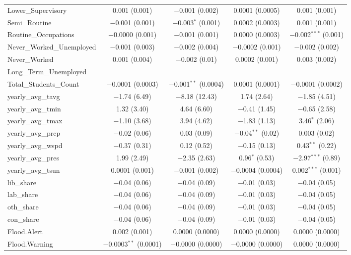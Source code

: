 \documentclass[12pt,letterpaper]{article}
\begin{document}
\begin{table}[!htbp]
\begin{adjustbox}{width=\textwidth}
\begin{tabular}{@{\extracolsep{5pt}}lcccc}
			Lower\_Supervisory & 0.001 (0.001) & $-$0.001 (0.002) & 0.0001 (0.0005) & 0.001 (0.001) \\ 
			Semi\_Routine & $-$0.001 (0.001) & $-$0.003$^{*}$ (0.001) & 0.0002 (0.0003) & 0.001 (0.001) \\ 
			Routine\_Occupations & $-$0.0000 (0.001) & $-$0.001 (0.001) & 0.0000 (0.0003) & $-$0.002$^{***}$ (0.001) \\ 
			Never\_Worked\_Unemployed & $-$0.001 (0.003) & $-$0.002 (0.004) & $-$0.0002 (0.001) & $-$0.002 (0.002) \\ 
			Never\_Worked & 0.001 (0.004) & $-$0.002 (0.01) & 0.0002 (0.001) & 0.003 (0.002) \\ 
			Long\_Term\_Unemployed &  &  &  &  \\ 
			Total\_Students\_Count & $-$0.0001 (0.0003) & $-$0.001$^{**}$ (0.0004) & 0.0001 (0.0001) & $-$0.0001 (0.0002) \\ 
			yearly\_avg\_tavg & $-$1.74 (6.49) & $-$8.18 (12.43) & 1.74 (2.64) & $-$1.85 (4.51) \\ 
			yearly\_avg\_tmin & 1.32 (3.40) & 4.64 (6.60) & $-$0.41 (1.45) & $-$0.65 (2.58) \\ 
			yearly\_avg\_tmax & $-$1.10 (3.68) & 3.94 (4.62) & $-$1.83 (1.13) & 3.46$^{*}$ (2.06) \\ 
			yearly\_avg\_prcp & $-$0.02 (0.06) & 0.03 (0.09) & $-$0.04$^{**}$ (0.02) & 0.003 (0.02) \\ 
			yearly\_avg\_wspd & $-$0.37 (0.31) & 0.12 (0.52) & $-$0.15 (0.13) & 0.43$^{**}$ (0.22) \\ 
			yearly\_avg\_pres & 1.99 (2.49) & $-$2.35 (2.63) & 0.96$^{*}$ (0.53) & $-$2.97$^{***}$ (0.89) \\ 
			yearly\_avg\_tsun & 0.0001 (0.001) & $-$0.001 (0.002) & $-$0.0004 (0.0004) & 0.002$^{***}$ (0.001) \\ 
			lib\_share & $-$0.04 (0.06) & $-$0.04 (0.09) & $-$0.01 (0.03) & $-$0.04 (0.05) \\ 
			lab\_share & $-$0.04 (0.06) & $-$0.04 (0.09) & $-$0.01 (0.03) & $-$0.04 (0.05) \\ 
			oth\_share & $-$0.04 (0.06) & $-$0.04 (0.09) & $-$0.01 (0.03) & $-$0.04 (0.05) \\ 
			con\_share & $-$0.04 (0.06) & $-$0.04 (0.09) & $-$0.01 (0.03) & $-$0.04 (0.05) \\ 
			Flood.Alert & 0.002 (0.001) & 0.0000 (0.0000) & 0.0000 (0.0000) & 0.0000 (0.0000) \\ 
			Flood.Warning & $-$0.0003$^{**}$ (0.0001) & $-$0.0000 (0.0000) & $-$0.0000 (0.0000) & 0.0000 (0.0000) \\ 

\end{tabular}
\end{adjustbox}
\end{table}
\end{document}
